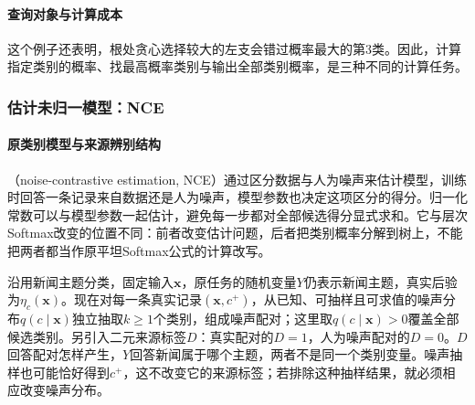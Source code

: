 \paragraph{查询对象与计算成本}
这个例子还表明，根处贪心选择较大的左支会错过概率最大的第3类。因此，计算指定类别的概率、找最高概率类别与输出全部类别概率，是三种不同的计算任务。

\subsubsection{估计未归一模型：NCE}

\paragraph{原类别模型与来源辨别结构}
（noise-contrastive estimation, NCE）通过区分数据与人为噪声来估计模型，训练时回答一条记录来自数据还是人为噪声，模型参数也决定这项区分的得分。归一化常数可以与模型参数一起估计，避免每一步都对全部候选得分显式求和。它与层次Softmax改变的位置不同：前者改变估计问题，后者把类别概率分解到树上，不能把两者都当作原平坦Softmax公式的计算改写。

沿用新闻主题分类，固定输入$\bm x$，原任务的随机变量$Y$仍表示新闻主题，真实后验为$\eta_c(\bm x)$。现在对每一条真实记录$(\bm x,c^+)$，从已知、可抽样且可求值的噪声分布$q(c\mid\bm x)$独立抽取$k\geq1$个类别，组成噪声配对；这里取$q(c\mid\bm x)>0$覆盖全部候选类别。另引入二元来源标签$D$：真实配对的$D=1$，人为噪声配对的$D=0$。$D$回答配对怎样产生，$Y$回答新闻属于哪个主题，两者不是同一个类别变量。噪声抽样也可能恰好得到$c^+$，这不改变它的来源标签；若排除这种抽样结果，就必须相应改变噪声分布。

